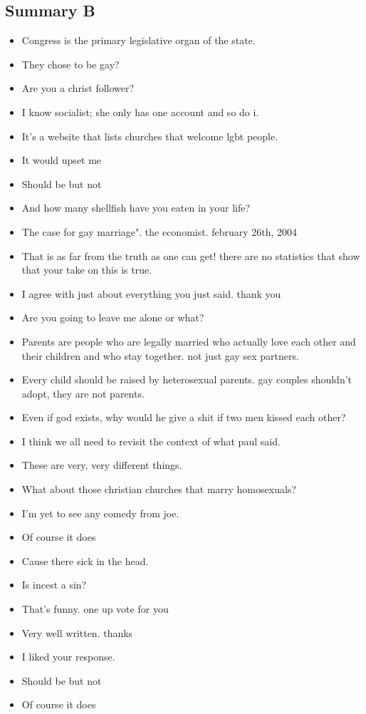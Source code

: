 \documentclass[tikz]{article}
\begin{document}
\begin{multicols}{2}
    \vfill
    \columnbreak

    \subsection*{Summary B}
    \begin{itemize}[noitemsep,nolistsep,label={}]
      \item{Congress is the primary legislative organ of the state.}
      \item{They chose to be gay?}
      \item{Are you a christ follower?}
      \item{I know socialist; she only has one account and so do i.}
      \item{It's a website that lists churches that welcome lgbt people.}
      \item{It would upset me}
      \item{Should be but not}
      \item{And how many shellfish have you eaten in your life?}
      \item{The case for gay marriage". the economist. february 26th, 2004}
      \item{That is as far from the truth as one can get! there are no statistics that show that your take on this is true.}
      \item{I agree with just about everything you just said. thank you}
      \item{Are you going to leave me alone or what?}
      \item{Parents are people who are legally married who actually love each other and their children and who stay together. not just gay sex partners.}
      \item{Every child should be raised by heterosexual parents. gay couples shouldn't adopt, they are not parents.}
      \item{Even if god exists, why would he give a shit if two men kissed each other?}
      \item{I think we all need to revisit the context of what paul said.}
      \item{These are very, very different things.}
      \item{What about those christian churches that marry homosexuals?}
      \item{I'm yet to see any comedy from joe.}
      \item{Of course it does}
      \item{Cause there sick in the head.}
      \item{Is incest a sin?}
      \item{That's funny. one up vote for you}
      \item{Very well written. thanks}
      \item{I liked your response.}
      \item{Should be but not}
      \item{Of course it does}
    \end{itemize}
  \end{multicols}
\end{document}
